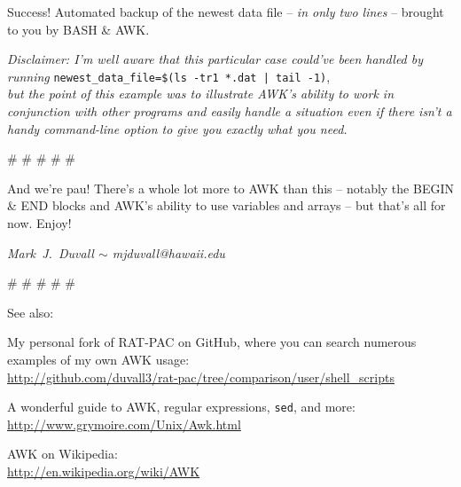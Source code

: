 \documentclass[10pt,a4]{article}
\begin{document}
\colorbox{black}{\color{white}{
run3.dat \qquad 100\% 273M 1.0MB/s 04:33
}}
\normalfont

Success! Automated backup of the newest data file -- \emph{in only two lines} -- brought to you by BASH \& AWK.

\scriptsize
\textit{Disclaimer: I'm well aware that this particular case could've been handled by running} \texttt{newest\_data\_file=\$(ls -tr1 *.dat | tail -1)},\\\textit{but the point of this example was to illustrate AWK's ability to work in conjunction with other programs and easily handle a situation even if there isn't a handy command-line option to give you exactly what you need.}
\normalsize


\pagebreak


\# \# \# \# \#


And we're pau! There's a whole lot more to AWK than this -- notably the BEGIN \& END blocks and AWK's ability to use variables and arrays -- but that's all for now. Enjoy!


\emph{Mark~J.~Duvall $\sim$ mjduvall@hawaii.edu}


\# \# \# \# \#

See also:

My personal fork of RAT-PAC on GitHub, where you can search numerous examples of my own AWK usage:\\
\url{http://github.com/duvall3/rat-pac/tree/comparison/user/shell\_scripts}

A wonderful guide to AWK, regular expressions, \texttt{sed}, and more:\\
\url{http://www.grymoire.com/Unix/Awk.html}

AWK on Wikipedia:\\
\url{http://en.wikipedia.org/wiki/AWK}



\end{document}

